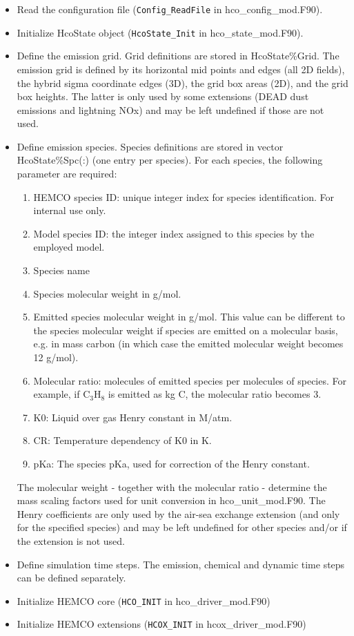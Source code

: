 \documentclass[12pt,a4paper]{article} %
\begin{document}
\begin{itemize}
\item Read the configuration file (\texttt{Config\_ReadFile} in hco\_config\_mod.F90).
\item Initialize HcoState object (\texttt{HcoState\_Init} in hco\_state\_mod.F90).
\item Define the emission grid. Grid definitions are stored in HcoState\%Grid. The emission grid is defined by its horizontal mid points and edges (all 2D fields), the hybrid sigma coordinate edges (3D), the grid box areas (2D), and the grid box heights. The latter is only used by some extensions (DEAD dust emissions and lightning NOx) and may be left undefined if those are not used.
\item Define emission species. Species definitions are stored in vector HcoState\%Spc(:) (one entry per species). For each species, the following parameter are required:
	\begin{enumerate}
	\item HEMCO species ID: unique integer index for species identification. For internal use only.
	\item Model species ID: the integer index assigned to this species by the employed model.
	\item Species name
	\item Species molecular weight in g/mol.
	\item Emitted species molecular weight in g/mol. This value can be different to the species molecular weight if species are emitted on a molecular basis, e.g. in mass carbon (in which case the emitted molecular weight becomes 12 g/mol).
	\item Molecular ratio: molecules of emitted species per molecules of species. For example, if C$_3$H$_8$ is emitted as kg C, the molecular ratio becomes 3.
	\item K0: Liquid over gas Henry constant in M/atm.
	\item CR: Temperature dependency of K0 in K.
	\item pKa: The species pKa, used for correction of the Henry constant.
	\end{enumerate}
The molecular weight - together with the molecular ratio - determine the mass scaling factors used for unit conversion in hco\_unit\_mod.F90. The Henry coefficients are only used by the air-sea exchange extension (and only for the specified species) and may be left undefined for other species and/or if the extension is not used.
\item Define simulation time steps. The emission, chemical and dynamic time steps can be defined separately.
\item Initialize HEMCO core (\texttt{HCO\_INIT} in hco\_driver\_mod.F90)
\item Initialize HEMCO extensions (\texttt{HCOX\_INIT} in hcox\_driver\_mod.F90)
\end{itemize}
\end{document}
